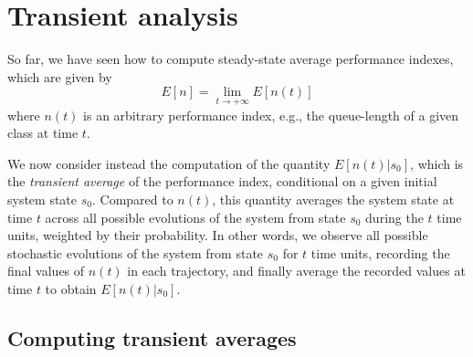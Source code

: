 


\section{Transient analysis}
So far, we have seen how to compute steady-state average performance indexes, which are given by
\[
E[n]=\lim\limits_{t\to +\infty }E[n(t)]
\]
where $n(t)$ is an arbitrary performance index, e.g., the queue-length of a given class at time $t$.

We now consider instead the computation of the quantity $E[n(t)|s_0]$, which is the {\em transient average} of the performance index, conditional on a given initial system state $s_0$. Compared to $n(t)$, this quantity averages the system state at time $t$ across all possible evolutions of the system from state $s_0$ during the $t$ time units, weighted by their probability. In other words, we observe all possible stochastic evolutions of the system from state $s_0$ for $t$ time units, recording the final values of $n(t)$ in each trajectory, and finally average the recorded values at time $t$ to obtain $E[n(t)|s_0]$.

\subsection{Computing transient averages}

